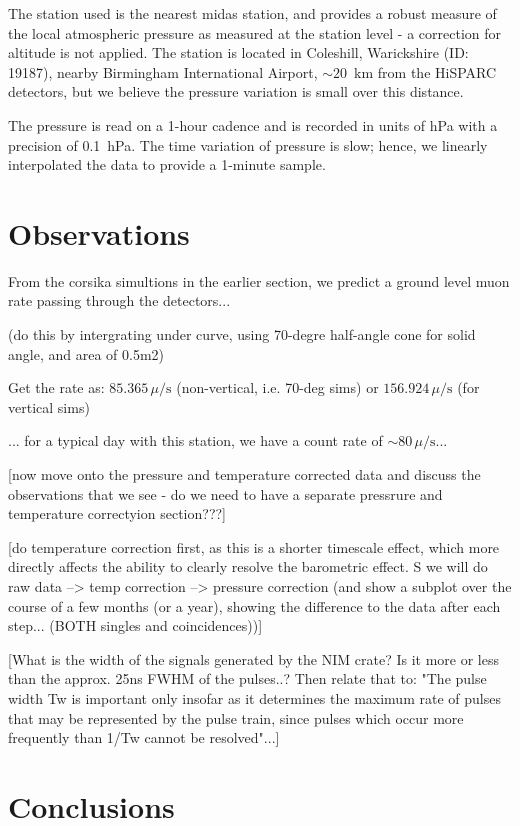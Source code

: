 The station used is the nearest \gls{midas} station, and provides a robust measure of the local atmospheric pressure as measured at the station level - a correction for altitude is not applied. The station is located in Coleshill, Warickshire (ID: 19187), nearby Birmingham International Airport, $\sim 20$~km from the HiSPARC detectors, but we believe the pressure variation is small over this distance.

The pressure is read on a 1-hour cadence and is recorded in units of hPa with a precision of 0.1~hPa. The time variation of pressure is slow; hence, we linearly interpolated the data to provide a 1-minute sample.


\section{Observations}\label{sec:HS_14008_observations}

From the \gls{corsika} simultions in the earlier section, we predict a ground level muon rate passing through the detectors...

(do this by intergrating under curve, using 70-degre half-angle cone for solid angle, and area of 0.5m2)

Get the rate as: $85.365 \, \mu/\mathrm{s}$ (non-vertical, i.e. 70-deg sims) or $156.924 \, \mu/\mathrm{s}$ (for vertical sims)

... for a typical day with this station, we have a count rate of $\sim 80 \, \mu/\mathrm{s}$...


[now move onto the pressure and temperature corrected data and discuss the observations that we see - do we need to have a separate pressrure and temperature correctyion section???]

[do temperature correction first, as this is a shorter timescale effect, which more directly affects the ability to clearly resolve the barometric effect. S we will do raw data --> temp correction --> pressure correction (and show a subplot over the course of a few months (or a year), showing the difference to the data after each step... (BOTH singles and coincidences))]


[What is the width of the signals generated by the NIM crate? Is it more or less than the approx. 25ns FWHM of the pulses..? Then relate that to: "The pulse width Tw is important only insofar as it determines the maximum rate of pulses that may be represented by the pulse train, since pulses which occur more frequently than 1/Tw cannot be resolved"...]

\section{Conclusions}\label{sec:HS_14008_conclusion}
